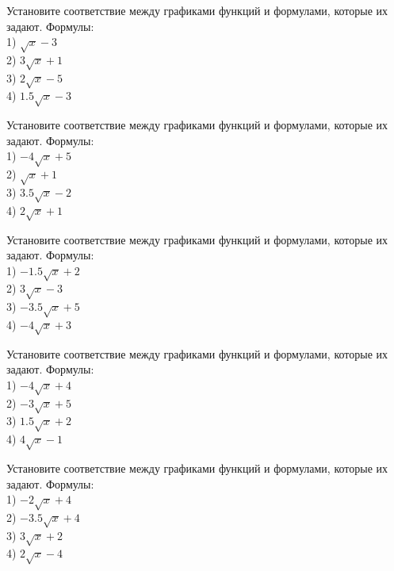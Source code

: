 \documentclass[4apaper]{article}
\begin{document}
\begin{taskBN}{71}
Установите соответствие между графиками функций и формулами, которые их задают. Формулы: \\1) $\sqrt{x}-3$\\2) $3\sqrt{x}+1$\\3) $2\sqrt{x}-5$\\4) $1.5\sqrt{x}-3$
\end{taskBN}

\begin{taskBN}{72}
Установите соответствие между графиками функций и формулами, которые их задают. Формулы: \\1) $-4\sqrt{x}+5$\\2) $\sqrt{x}+1$\\3) $3.5\sqrt{x}-2$\\4) $2\sqrt{x}+1$
\end{taskBN}

\begin{taskBN}{73}
Установите соответствие между графиками функций и формулами, которые их задают. Формулы: \\1) $-1.5\sqrt{x}+2$\\2) $3\sqrt{x}-3$\\3) $-3.5\sqrt{x}+5$\\4) $-4\sqrt{x}+3$
\end{taskBN}

\begin{taskBN}{74}
Установите соответствие между графиками функций и формулами, которые их задают. Формулы: \\1) $-4\sqrt{x}+4$\\2) $-3\sqrt{x}+5$\\3) $1.5\sqrt{x}+2$\\4) $4\sqrt{x}-1$
\end{taskBN}

\begin{taskBN}{75}
Установите соответствие между графиками функций и формулами, которые их задают. Формулы: \\1) $-2\sqrt{x}+4$\\2) $-3.5\sqrt{x}+4$\\3) $3\sqrt{x}+2$\\4) $2\sqrt{x}-4$
\end{taskBN}
\end{document}
